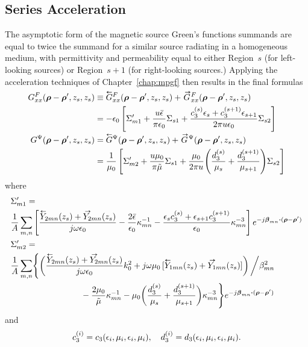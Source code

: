 \subsection{Series Acceleration}
The asymptotic form of the magnetic source Green's functions  summands
are equal to twice the summand for a similar source radiating in a
homogeneous medium, with permittivity and permeability equal to either
Region~$s$ (for left-looking sources) or Region~$s+1$ (for
right-looking sources.)  Applying the acceleration techniques of
Chapter~\ref{chap:mpgf} then results in the final formulas
\begin{subequations}
  \begin{align}
    \GFxx(\vecrho-\vecrho',z_s,z_s)  &\equiv
    \GlFxx(\vecrho-\vecrho',z_s,z_s) +  \GrFxx(\vecrho-\vecrho',z_s,z_s) 
    \nonumber \\
    &=
    -\epsilon_0 
    \left[
      \Sigma'_{m1} + \frac{u\bar{\epsilon}}{\pi\epsilon_0} \Sigma_{s1}
      + \frac{c_3\ess \epsilon_s + c_3\spw\epsilon_{s+1}}%
      {2\pi u\epsilon_0} \Sigma_{s2} 
    \right]  \\
    \GPsi(\vecrho-\vecrho',z_s,z_s) &= 
    \GlPsi(\vecrho-\vecrho',z_s,z_s) +  \GrPsi(\vecrho-\vecrho',z_s,z_s)  
    \nonumber \\
    &= \frac{1}{\mu_0}
    \left[
      \Sigma'_{m2} + \frac{u\mu_0}{\pi\tilde{\mu}} \Sigma_{s1}
      + \frac{\mu_0}{2\pi u} 
      \Biggl(
      \frac{d_3\ess}{\mu_s}+\frac{d_3\spw}{\mu_{s+1}}
      \Biggr)
      \Sigma_{s2}
    \right]
  \end{align}
\end{subequations}
where
\begin{subequations}
  \begin{align}
    & \Sigma'_{m1} = \nonumber \\
    & \frac{1}{A} \summn
    \left[
      \frac{\Yleft_{2mn}(z_s) + \Yright_{2mn}(z_s)}{j\omega\epsilon_0} 
      - \frac{2\bar{\epsilon}}{\epsilon_0} \kappa_{mn}^{-1}
      - \frac{\epsilon_s c_3\ess + \epsilon_{s+1}c_3\spw}{\epsilon_0} 
      \kappa_{mn}^{-3}
    \right]
    e^{-j\vecbeta_{mn} \bdot (\vecrho-\vecrho')}  \\ 
    & \Sigma'_{m2} = \nonumber \\
    & \frac{1}{A} \summn
    \Biggl\{
    \left(
      \frac{\textstyle\Yleft_{2mn}(z_s) + \Yright_{2mn}(z_s)}
      {j\omega\epsilon_0} k_0^2
      + j\omega\mu_0\left[\Yleft_{1mn}(z_s) + \Yright_{1mn}(z_s)\right] 
    \right) 
    \bigg/ {\beta_{mn}^2} \nonumber \\
    & \mkern 150mu \mbox{} - \frac{2\mu_0}{\tilde{\mu}} \kappa_{mn}^{-1}
    - \mu_0\biggl(\frac{d_3\ess}{\mu_s}+\frac{d_3\spw}{\mu_{s+1}}\biggr)
    \kappa_{mn}^{-3}
    \Biggr\}
    e^{-j\vecbeta_{mn} \bdot (\vecrho-\vecrho')}
  \end{align}
  \label{eq:finalmodalmagnetic}
\end{subequations}
and
\begin{equation}
    c_3^{(i)} = c_3(\epsilon_i,\mu_i,\epsilon_i,\mu_i), \quad
    d_3^{(i)} = d_3(\epsilon_i,\mu_i,\epsilon_i,\mu_i).
\end{equation}

